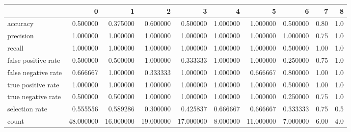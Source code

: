 \begin{tabular}{lrrrrrrrrr}
\toprule
{} &          0 &          1 &          2 &          3 &         4 &          5 &         6 &     7 &    8 \\
\midrule
accuracy            &   0.500000 &   0.375000 &   0.600000 &   0.500000 &  1.000000 &   1.000000 &  0.500000 &  0.80 &  1.0 \\
precision           &   1.000000 &   1.000000 &   1.000000 &   1.000000 &  1.000000 &   1.000000 &  1.000000 &  0.75 &  1.0 \\
recall              &   1.000000 &   1.000000 &   1.000000 &   1.000000 &  1.000000 &   1.000000 &  0.500000 &  1.00 &  1.0 \\
false positive rate &   0.500000 &   0.500000 &   1.000000 &   0.333333 &  1.000000 &   1.000000 &  0.250000 &  0.75 &  1.0 \\
false negative rate &   0.666667 &   1.000000 &   0.333333 &   1.000000 &  1.000000 &   0.666667 &  0.800000 &  1.00 &  1.0 \\
true positive rate  &   1.000000 &   1.000000 &   1.000000 &   1.000000 &  1.000000 &   1.000000 &  0.500000 &  1.00 &  1.0 \\
true negative rate  &   0.500000 &   0.500000 &   1.000000 &   1.000000 &  1.000000 &   1.000000 &  0.250000 &  0.75 &  1.0 \\
selection rate      &   0.555556 &   0.589286 &   0.300000 &   0.425837 &  0.666667 &   0.666667 &  0.333333 &  0.75 &  0.5 \\
count               &  48.000000 &  16.000000 &  19.000000 &  17.000000 &  8.000000 &  11.000000 &  7.000000 &  6.00 &  4.0 \\
\bottomrule
\end{tabular}
